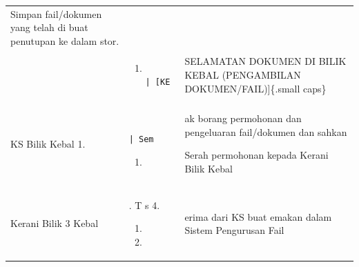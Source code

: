 \documentclass[
]{article}
\begin{document}
\begin{longtable}[]{@{}lll@{}}
\begin{minipage}[t]{0.30\columnwidth}
Simpan fail/dokumen yang telah di buat penutupan ke dalam stor.\strut
\end{minipage}\tabularnewline
\begin{minipage}[t]{0.30\columnwidth}\raggedright
\strut
\end{minipage} & \begin{minipage}[t]{0.30\columnwidth}\raggedright
\begin{enumerate}
\def\labelenumi{\Alph{enumi}.}
\setcounter{enumi}{3}
\item
\begin{verbatim}
           | [KE
\end{verbatim}
\end{enumerate}\strut
\end{minipage} & \begin{minipage}[t]{0.30\columnwidth}\raggedright
SELAMATAN DOKUMEN DI BILIK KEBAL (PENGAMBILAN DOKUMEN/FAIL){]}\{.small
caps\}\strut
\end{minipage}\tabularnewline
\begin{minipage}[t]{0.30\columnwidth}\raggedright
KS Bilik Kebal \textbar{} 1.\strut
\end{minipage} & \begin{minipage}[t]{0.30\columnwidth}\raggedright
\begin{verbatim}
              | Sem
\end{verbatim}

\begin{enumerate}
\def\labelenumi{\arabic{enumi}.}
\setcounter{enumi}{1}
\item
\end{enumerate}\strut
\end{minipage} & \begin{minipage}[t]{0.30\columnwidth}\raggedright
ak borang permohonan dan pengeluaran fail/dokumen dan sahkan

Serah permohonan kepada Kerani Bilik Kebal\strut
\end{minipage}\tabularnewline
\begin{minipage}[t]{0.30\columnwidth}\raggedright
Kerani Bilik \textbar{} 3 Kebal \textbar{}\strut
\end{minipage} & \begin{minipage}[t]{0.30\columnwidth}\raggedright
. \textbar{} T \textbar{} s 4.

\begin{enumerate}
\def\labelenumi{\arabic{enumi}.}
\setcounter{enumi}{4}
\item
\item
\end{enumerate}\strut
\end{minipage} & \begin{minipage}[t]{0.30\columnwidth}\raggedright
erima dari KS buat emakan dalam Sistem Pengurusan Fail


\end{minipage}
\end{longtable}
\end{document}
